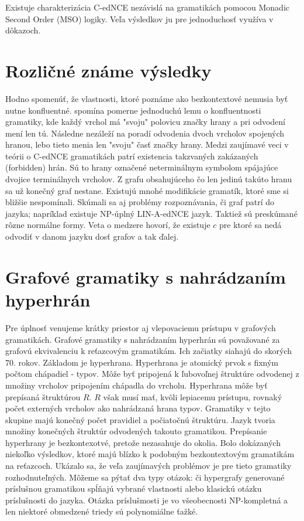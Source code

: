 \begin{pozn}
Existuje charakterizácia C-edNCE nezávislá na gramatikách pomocou Monadic Second Order (MSO) logiky.
Veľa výsledkov ju pre jednoduchosť využíva v dôkazoch.
\end{pozn}

\section{Rozličné známe výsledky}

Hodno spomenúť, že vlastnosti, ktoré poznáme ako bezkontextové nemusia byť
nutne konfluentné. \cite{GG} spomína pomerne jednoduchú lemu o
konfluentnosti gramatiky, kde každý vrchol má "svoju" polovicu značky hrany a
pri odvodení mení len tú. Následne nezáleží na poradí odvodenia dvoch
vrcholov spojených hranou, lebo tieto menia len "svoju" časť značky hrany.
Medzi zaujímavé veci v teórii o C-edNCE gramatikách patrí existencia
takzvaných zakázaných (forbidden) hrán. Sú to hrany označené neterminálnym
symbolom spájajúce dvojice terminálnych vrcholov. Z grafu obsahujúceho čo
len jedinú takúto hranu sa už konečný graf nestane.
Existujú mnohé modifikácie gramatík, ktoré sme si bližšie nespomínali.
Skúmali sa aj problémy rozpoznávania, či graf patrí do jazyka; 
napríklad existuje NP-úplný LIN-A-edNCE jazyk.
Taktiež sú preskúmané rôzne normálne formy. Veta o medzere hovorí, že
existuje $c$ pre ktoré sa nedá odvodiť v danom jazyku dosť grafov a tak
ďalej.

\section{Grafové gramatiky s nahrádzaním hyperhrán}
Pre úplnosť venujeme krátky priestor aj vlepovaciemu prístupu v grafových
gramatikách.
Grafové gramatiky s nahrádzaním hyperhrán sú považované za grafovú
ekvivalenciu k reťazcovým gramatikám. Ich začiatky siahajú do skorých 70.
rokov. Základom je hyperhrana. Hyperhrana je atomický prvok s fixným počtom
chápadiel - typov. Môže byť pripojená k ľubovoľnej štruktúre odvodenej z
množiny vrcholov pripojením chápadla do vrcholu. Hyperhrana môže byť
prepísaná štruktúrou $R$. $R$ však musí mať, kvôli lepiacemu prístupu,
rovnaký počet externých vrcholov ako nahrádzaná hrana typov.
Gramatiky v tejto skupine majú konečný počet pravidiel a počiatočnú
štruktúru. Jazyk tvoria množiny konečných štruktúr odvodených takouto
gramatikou. Prepísanie hyperhrany je bezkontexotvé, pretože nezasahuje do
okolia. Bolo dokázaných niekoľko výsledkov, ktoré majú blízko k podobným
bezkontextovým gramatikám na reťazcoch. Ukázalo sa, že veľa zaujímavých
problémov je pre tieto gramatiky rozhodnuteľných.
Môžeme sa pýtať dva typy otázok: či hypergrafy generované príslušnou
gramatikou spĺňajú vybrané vlastnosti alebo klasickú otázku príslušnosti do
jazyka. Otázka príslušmosti je vo všeobecnosti NP-kompletná a len niektoré
obmedzené  triedy sú polynomiálne ťažké.
\iffalse
/? TODO
regulárne grafové gramatiky
TODO ?/

Zaujímajú nás predovšetkým výsledky týkajúce sa "náročnosti" generovania 
grafov, ktoré je možné porovnávať s výsledkami nášho prístupu.
\fi


